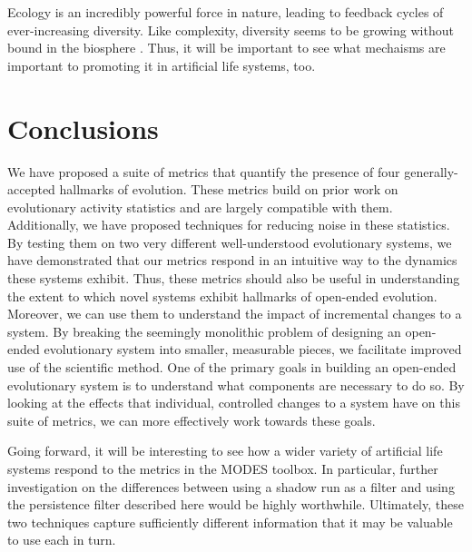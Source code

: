 \documentclass[letterpaper]{article}
\begin{document}

Ecology is an incredibly powerful force in nature, leading to feedback cycles of ever-increasing diversity. Like complexity, diversity seems to be growing without bound in the biosphere \citep{harmon_species_2015}. Thus, it will be important to see what mechaisms are important to promoting it in artificial life systems, too.

\section{Conclusions}
We have proposed a suite of metrics that quantify the presence of four generally-accepted hallmarks of evolution. These metrics build on prior work on evolutionary activity statistics and are largely compatible with them. Additionally, we have proposed techniques for reducing noise in these statistics.  By testing them on two very different well-understood evolutionary systems, we have demonstrated that our metrics respond in an intuitive way to the dynamics these systems exhibit. Thus, these metrics should also be useful in understanding the extent to which novel systems exhibit hallmarks of open-ended evolution. Moreover, we can use them to understand the impact of incremental changes to a system. By breaking the seemingly monolithic problem of designing an open-ended evolutionary system into smaller, measurable pieces, we facilitate improved use of the scientific method. One of the primary goals in building an open-ended evolutionary system is to understand what components are necessary to do so. By looking at the effects that individual, controlled changes to a system have on this suite of metrics, we can more effectively work towards these goals.

Going forward, it will be interesting to see how a wider variety of artificial life systems respond to the metrics in the MODES toolbox. In particular, further investigation on the differences between using a shadow run as a filter and using the persistence filter described here would be highly worthwhile. Ultimately, these two techniques capture sufficiently different information that it may be valuable to use each in turn.

\end{document}
